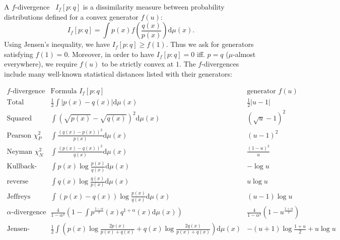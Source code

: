 \documentclass[11pt]{article}
\def\dmu{\mathrm{d}\mu}
\def\dmu{\mathrm{d}\mu}
\begin{document}
A $f$-divergence~\cite{Morimoto-1963,EN-PhD-Csiszar-1967,fdiv-AliSilvey-1966,Csiszar-1972} $I_f[p:q]$ is a dissimilarity measure between probability distributions defined for a convex generator $f(u)$:
$$
I_f[p:q]=\int p(x) f\left(\frac{q(x)}{p(x)}\right) \dmu(x).
$$
Using Jensen's inequality, we have $I_f[p:q]\geq f(1)$. Thus we ask for generators satisfying $f(1)=0$.
Moreover, in order to have $I_f[p:q]=0$ iff. $p=q$ ($\mu$-almost everywhere), we require $f(u)$ to be strictly convex at $1$.
The $f$-divergences include many well-known statistical distances listed with their generators: %

\begin{center}
$
\begin{array}{lll}
\text{$f$-divergence } & \text{Formula $I_f[p:q]$} & \text{generator $f(u)$}\\
\hline\hline
\text{Total variation (metric)} & \frac{1}{2}\int |p(x)-q(x)| \dmu(x) & \frac{1}{2} |u-1| \\
\text{Squared Hellinger} & \int (\sqrt{p(x)}-\sqrt{q(x)})^2 \dmu(x) & (\sqrt{u}-1)^2\\
\text{Pearson $\chi^2_P$}  &  \int \frac{(q(x)-p(x))^2}{p(x)} \dmu(x) & (u-1)^2\\
\text{Neyman $\chi^2_N$}  &  \int \frac{(p(x)-q(x))^2}{q(x)} \dmu(x) & \frac{(1-u)^2}{u}\\
\text{Kullback-Leibler} & \int p(x)\log \frac{p(x)}{q(x)} \dmu(x) & -\log u\\
\text{reverse Kullback-Leibler} & \int q(x)\log \frac{q(x)}{p(x)} \dmu(x) & u\log u \\
\text{Jeffreys divergence} &\int (p(x)-q(x))\log\frac{p(x)}{q(x)} \dmu(x) & (u-1)\log u\\
\text{$\alpha$-divergence} &  \frac{4}{1-\alpha^2} (1-\int p^{\frac{1-\alpha}{2}}(x) q^{1+\alpha}(x) \dmu(x))  & \frac{4}{1-\alpha^2}(1-u^{\frac{1+\alpha}{2}})\\ 
\text{Jensen-Shannon} & \frac{1}{2}\int (p(x)\log \frac{2p(x)}{p(x)+q(x)} +  q(x)\log \frac{2q(x)}{p(x)+q(x)})\dmu(x) 
&  -(u+1)\log \frac{1+u}{2} + u\log u\\
\end{array}
$
\end{center}


 
\end{document}
